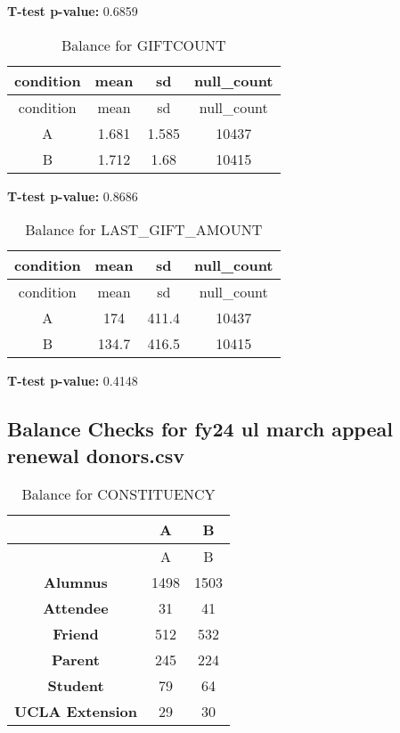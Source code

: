 \documentclass[
]{article}
\begin{document}
\textbf{T-test p-value:} 0.6859\\
\pagebreak

\begin{longtable}[]{@{}cccc@{}}
\caption{Balance for GIFTCOUNT}\tabularnewline
\toprule\noalign{}
condition & mean & sd & null\_count \\
\midrule\noalign{}
\endfirsthead
\toprule\noalign{}
condition & mean & sd & null\_count \\
\midrule\noalign{}
\endhead
\bottomrule\noalign{}
\endlastfoot
A & 1.681 & 1.585 & 10437 \\
B & 1.712 & 1.68 & 10415 \\
\end{longtable}

\textbf{T-test p-value:} 0.8686\\
\pagebreak

\begin{longtable}[]{@{}cccc@{}}
\caption{Balance for LAST\_GIFT\_AMOUNT}\tabularnewline
\toprule\noalign{}
condition & mean & sd & null\_count \\
\midrule\noalign{}
\endfirsthead
\toprule\noalign{}
condition & mean & sd & null\_count \\
\midrule\noalign{}
\endhead
\bottomrule\noalign{}
\endlastfoot
A & 174 & 411.4 & 10437 \\
B & 134.7 & 416.5 & 10415 \\
\end{longtable}

\textbf{T-test p-value:} 0.4148\\
\pagebreak \clearpage

\subsection{Balance Checks for fy24 ul march appeal renewal
donors.csv}\label{balance-checks-for-fy24-ul-march-appeal-renewal-donors.csv}

\begin{longtable}[]{@{}ccc@{}}
\caption{Balance for CONSTITUENCY}\tabularnewline
\toprule\noalign{}
~ & A & B \\
\midrule\noalign{}
\endfirsthead
\toprule\noalign{}
~ & A & B \\
\midrule\noalign{}
\endhead
\bottomrule\noalign{}
\endlastfoot
\textbf{Alumnus} & 1498 & 1503 \\
\textbf{Attendee} & 31 & 41 \\
\textbf{Friend} & 512 & 532 \\
\textbf{Parent} & 245 & 224 \\
\textbf{Student} & 79 & 64 \\
\textbf{UCLA Extension} & 29 & 30 \\
\end{longtable}
\end{document}

